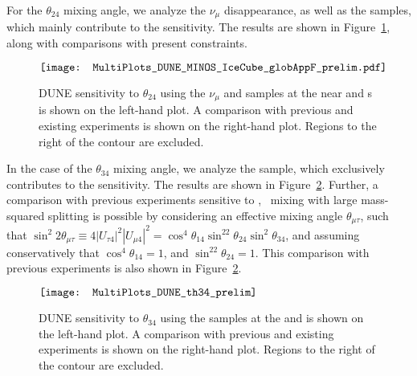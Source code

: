 For the $\theta_{24}$ mixing angle, we analyze the $\nu_{\mu}$  disappearance, as well as the  samples, which mainly contribute to the sensitivity. 
The results are shown in Figure~\ref{th_24}, along with comparisons with present constraints.
\begin{figure}[!htbp]
\centering
$\vcenter{\hbox{\texttt{[image: MultiPlots\_DUNE\_MINOS\_IceCube\_globAppF\_prelim.pdf]}}}$
\caption[Sensitivity to $\theta_{24}$ using the $\nu_\mu$  and  samples at near and s]{DUNE sensitivity to $\theta_{24}$ using the $\nu_\mu$  and  samples at the near and s is shown on the left-hand plot. A comparison with previous and existing experiments is shown on the right-hand plot. Regions to the right of the contour are excluded.}
\label{th_24}
\end{figure}
    In the case of the $\theta_{34}$ mixing angle, we analyze the  sample, which exclusively contributes to the sensitivity. 
    The results are shown in Figure~\ref{th_34}. Further, a comparison with previous experiments sensitive to \numu, \nutau~mixing with large mass-squared splitting is possible by considering an effective mixing angle $\theta_{\mu\tau}$, such that $\sin^2{2\theta_{\mu\tau}}\equiv 4|U_{\tau4}|^2|U_{\mu 4}|^2=\cos^4\theta_{14}\sin^22\theta_{24}\sin^2\theta_{34}$, and assuming conservatively that $\cos^4\theta_{14}=1$, and $\sin^22\theta_{24}=1$. This comparison with previous experiments is also shown in Figure~\ref{th_34}.
\begin{figure}
\centering
$\vcenter{\hbox{\texttt{[image: MultiPlots\_DUNE\_th34\_prelim]}}}$
\caption[Sensitivity to $\theta_{34}$ using the  samples at the   and ]{DUNE sensitivity to $\theta_{34}$ using the  samples at the  and  is shown on the left-hand plot. A comparison with previous and existing experiments is shown on the right-hand plot. Regions to the right of the contour are excluded.}
\label{th_34}
\end{figure}


